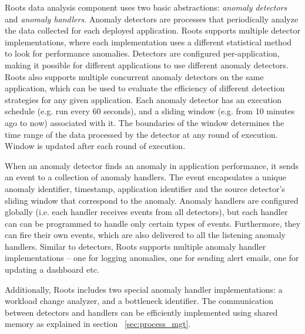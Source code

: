 Roots data analysis component uses two basic abstractions: \textit{anomaly detectors} 
and \textit{anomaly handlers}.
Anomaly detectors are processes that periodically analyze the data collected for
each deployed application. Roots supports multiple detector implementations, where each implementation
uses a different statistical method to look for performance anomalies. Detectors are configured
per-application, making it possible for different applications to use different anomaly 
detectors. Roots also supports multiple concurrent anomaly detectors on the same application, which can be used
to evaluate the efficiency of different detection strategies for any given application. Each
anomaly detector has an execution schedule (e.g. run every 60 seconds), and a sliding window 
(e.g. from 10 minutes ago to now)
associated with it. The boundaries of the window determines the time range
of the data processed by the detector at any round of execution. Window is updated 
after each round of execution. 

When an anomaly detector finds an anomaly in application performance, it sends an event
to a collection of anomaly handlers. The event encapsulates a unique anomaly identifier, 
timestamp, application identifier and the source detector's sliding window that correspond to the
anomaly. Anomaly handlers are configured globally (i.e. each handler
receives events from all detectors), but each handler can can be programmed to handle only
certain types of events. Furthermore, they can fire their own events, which are also delivered to
all the listening anomaly handlers. Similar to detectors, Roots supports multiple anomaly handler
implementations -- one for logging anomalies, one for sending alert emails, one
for updating a dashboard etc. 

Additionally, Roots includes two special anomaly handler
implementations: a workload change analyzer, and a bottleneck identifier.
The communication between detectors and handlers can be efficiently implemented
using shared memory as explained in section ~\ref{sec:process_mgt}.


